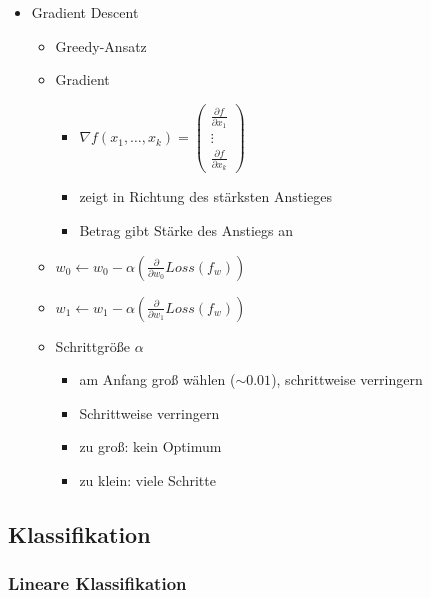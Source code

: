 \documentclass[nonacm=true, language=german]{acmart}
\begin{document}
\begin{itemize}
    \item Gradient Descent
    \begin{itemize}
        \item Greedy-Ansatz
        \item Gradient
        \begin{itemize}
            \item $ \nabla f(x_1, \dots, x_k) = \begin{pmatrix} \frac{\partial f}{\partial x_1} \\ \vdots \\ \frac{\partial f}{\partial x_k} \end{pmatrix} $
            \item zeigt in Richtung des stärksten Anstieges
            \item Betrag gibt Stärke des Anstiegs an
        \end{itemize}
        \item $ w_0 \leftarrow w_0 - \alpha (\frac{\partial}{\partial w_0} Loss(f_w)) $
        \item $ w_1 \leftarrow w_1 - \alpha (\frac{\partial}{\partial w_1} Loss(f_w)) $
        \item \label{alpha} Schrittgröße $\alpha$
        \begin{itemize}
            \item am Anfang groß wählen ($\sim 0.01$), schrittweise verringern
            \item Schrittweise verringern
            \item zu groß: kein Optimum
            \item zu klein: viele Schritte
        \end{itemize}
    \end{itemize}
\end{itemize}

\subsection{Klassifikation}

\subsubsection{Lineare Klassifikation}
\end{document}
